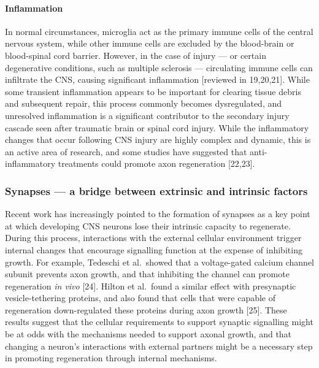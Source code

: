 \documentclass[
  12pt,
  a4paper,
]{book}
\begin{document}
\hypertarget{inflammation}{%
\paragraph{Inflammation}\label{inflammation}}

In normal circumstances, microglia act as the primary immune cells of the central nervous system, while other immune cells are excluded by the blood-brain or blood-spinal cord barrier. However, in the case of injury --- or certain degenerative conditions, such as multiple sclerosis --- circulating immune cells can infiltrate the CNS, causing significant inflammation {[}reviewed in 19,20,21{]}. While some transient inflammation appears to be important for clearing tissue debris and subsequent repair, this process commonly becomes dysregulated, and unresolved inflammation is a significant contributor to the secondary injury cascade seen after traumatic brain or spinal cord injury. While the inflammatory changes that occur following CNS injury are highly complex and dynamic, this is an active area of research, and some studies have suggested that anti-inflammatory treatments could promote axon regeneration {[}22,23{]}.

\hypertarget{synapses-a-bridge-between-extrinsic-and-intrinsic-factors}{%
\subsubsection{Synapses --- a bridge between extrinsic and intrinsic factors}\label{synapses-a-bridge-between-extrinsic-and-intrinsic-factors}}

Recent work has increasingly pointed to the formation of synapses as a key point at which developing CNS neurons lose their intrinsic capacity to regenerate. During this process, interactions with the external cellular environment trigger internal changes that encourage signalling function at the expense of inhibiting growth. For example, Tedeschi et al.~showed that a voltage-gated calcium channel subunit prevents axon growth, and that inhibiting the channel can promote regeneration \emph{in vivo} {[}24{]}. Hilton et al.~found a similar effect with presynaptic vesicle-tethering proteins, and also found that cells that were capable of regeneration down-regulated these proteins during axon growth {[}25{]}. These results suggest that the cellular requirements to support synaptic signalling might be at odds with the mechanisms needed to support axonal growth, and that changing a neuron's interactions with external partners might be a necessary step in promoting regeneration through internal mechanisms.
\end{document}

